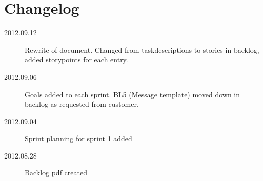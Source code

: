\documentclass[a4paper, norsk, 12pt]{article}
\newcommand{\dateFormat}[3]{#3.#1.#2}
\begin{document}
	\section{Changelog}
		\begin{description}
			\item[\dateFormat{09}{12}{2012}] Rewrite of document. Changed from taskdescriptions to stories in backlog, added storypoints for each entry. 
			\item[\dateFormat{09}{06}{2012}] Goals added to each sprint. BL5 (Message template) moved down in backlog as requested from customer.
			\item[\dateFormat{09}{04}{2012}] Sprint planning for sprint 1 added
			\item[\dateFormat{08}{28}{2012}] Backlog pdf created
		\end{description}
\end{document}
